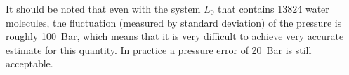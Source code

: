 \documentclass[a4paper,preprint,unsortedaddress,onecolumn,fleqn]{revtex4}
\newcommand{\eps}{\varepsilon}
\newcommand{\systemmb}{M_1}
\newcommand{\systemlb}{L_1}
\begin{document}
It should be noted that even with the system $L_{0}$ that
contains 13824 water molecules, the fluctuation
(measured by standard deviation) of the pressure is roughly 100~Bar, which
means that it is very difficult to achieve very accurate estimate for this
quantity. In practice a pressure error of 20~Bar is still acceptable.

\end{document}
